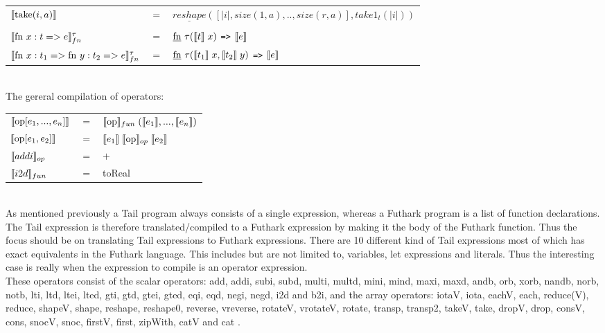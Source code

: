 \documentclass[11pt]{article}
\begin{document}
\begin{tabular}{l c l}
$\llbracket \text{take}(i,a) \rrbracket$ & $=$ & $\underline{reshape}([|i|, size(1,a),..,size(r,a)],
                                                           take1_t(|i|))$\\

\\
%
%
$\llbracket  \text{fn } x:t => e \rrbracket^{\tau}_{fn} $ & $=$ & $ \text{\underline{fn} } \tau (\llbracket t \rrbracket\; x) $ {\tt =>} $ \llbracket e \rrbracket$\\
$\llbracket  \text{fn } x:t_1 = >\text{fn } y:t_2 => e \rrbracket^{\tau}_{fn} $ & $=$ & $ \text{\underline{fn} } \tau (\llbracket t_1 \rrbracket\; x, \llbracket t_2 \rrbracket \; y) $ {\tt =>} $ \llbracket e \rrbracket$\\
\end{tabular}\\

The gereral compilation of operators:\\

\begin{tabular}{l c l}
$\llbracket \text{op} [e_1,...,e_n] \rrbracket$ & $=$ & $\llbracket \text{op} \rrbracket_{fun} \; (\llbracket e_1 \rrbracket,...,\llbracket e_n \rrbracket)$\\
$\llbracket \text{op} [e_1,e_2] \rrbracket$ & $=$ & $\llbracket e_1 \rrbracket \; \llbracket \text{op} \rrbracket_{op} \; \llbracket e_2 \rrbracket$\\
$\llbracket addi \rrbracket_{op}$ & $=$ & $+$\\
$\llbracket i2d \rrbracket_{fun}$ & $=$ & toReal\\ 
\end{tabular}\\

As mentioned previously a Tail program always consists of a single expression,
whereas a Futhark program is a list of function declarations.
The Tail expression is therefore translated/compiled to a Futhark expression by making it the body of the Futhark function\cite{ElsmanDybdal:Array:2014}\cite{TroelsHenriksen}. 
Thus the focus should be on translating Tail expressions to Futhark expressions. 
There are 10 different kind of Tail expressions most of which has exact equivalents in the Futhark language.
This includes but are not limited to, variables, let expressions and literals.
Thus the interesting case is really when the expression to compile is an operator expression. \\

These operators consist of the scalar operators: add, addi, subi, subd, multi, multd, mini, mind, maxi, maxd, andb, orb, xorb, nandb, norb, notb, lti, ltd, ltei, lted, gti, gtd, gtei, gted, eqi, eqd, negi, negd, i2d and b2i, and the array operators: iotaV, iota, eachV, each, reduce(V), reduce, shapeV, shape, reshape, reshape0, reverse, vreverse, rotateV, vrotateV, rotate, transp, transp2, takeV, take, dropV, drop, consV, cons, snocV, snoc, firstV, first, zipWith, catV and cat \cite{ElsmanDybdal:Array:2014}. \\
\end{document}
